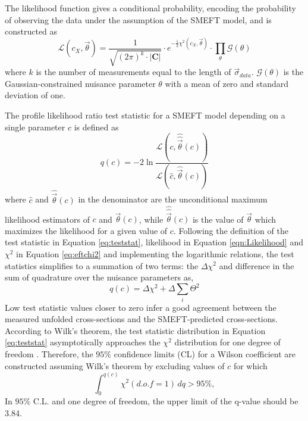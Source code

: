 The likelihood function gives a conditional probability, encoding the probability of observing the data under the assumption of the SMEFT model, and is constructed as 
\begin{equation}
    \mathcal{L}(c_X, \vec{\theta}) = \frac{1}{\sqrt{(2\pi)^k\cdot|\textbf{C}|}} \cdot e^{-\frac{1}{2}\chi^2(c_X, \vec{\theta})} \cdot \prod_{\theta}\mathcal{G}(\theta)
    \label{eqn:Likelihood}
\end{equation}
where $k$ is the number of measurements equal to the length of $\vec{\sigma}_{data}$. $\mathcal{G}(\theta)$ is the Gaussian-constrained nuisance parameter $\theta$ with a mean of zero and standard deviation of one. 

The profile likelihood ratio test statistic for a SMEFT model depending on a single parameter $c$ is defined as
\begin{equation}
    q(c) = -2 \ln \frac{\mathcal{L}(c, \hat{\hat{\vec{\theta}}}(c))}{\mathcal{L}(\hat{c}, \hat{\vec{\theta}}(c))}
\label{eq:teststat}
\end{equation}
where $\hat{c}$ and $\hat{\vec{\theta}}(c)$ in the denominator are the unconditional maximum likelihood estimators of $c$ and $\vec{\theta}(c)$, while $\hat{\hat{\vec{\theta}}}(c)$ is the value of $\vec{\theta}$ which maximizes the likelihood for a given value of $c$. Following the definition of the test statistic in Equation \ref{eq:teststat}, likelihood in Equation \ref{eqn:Likelihood} and $\chi^2$ in Equation \ref{eq:eftchi2} and implementing the logarithmic relations, the test statistics simplifies to a summation of two terms: the $\Delta \chi^2$ and difference in the sum of quadrature over the nuisance parameters as, 
\begin{equation}
    q(c) = \Delta \chi^2 + \Delta \sum_{i}{\Theta^2}
    \label{eqn:SimplifiedTestStat}
\end{equation}
Low test statistic values closer to zero infer a good agreement between the measured unfolded cross-sections and the SMEFT-predicted cross-sections. According to Wilk's theorem, the test statistic distribution in Equation \ref{eq:teststat} asymptotically approaches the $\chi^2$ distribution for one degree of freedom \cite{WilksTheorem}. Therefore, the $95\%$ confidence limits (CL) for a Wilson coefficient are constructed assuming Wilk's theorem by excluding values of $c$ for which
\begin{equation}
    \int_{0}^{q(c)} \chi^2(d.o.f = 1) \, dq > 95 \%,
\label{eq:chi2cdf}
\end{equation}
In $95\%$ C.L. and one degree of freedom, the upper limit of the q-value should be 3.84. 

